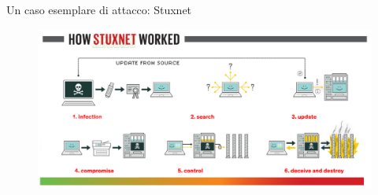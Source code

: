 \begin{frame}{Un caso esemplare di attacco: Stuxnet}
	\begin{figure}[h] 
		\includegraphics[scale=0.3,cfbox=blue_slides 1pt 0pt]{imgs/stuxnet_hsw.png}
	\end{figure}
\end{frame}


